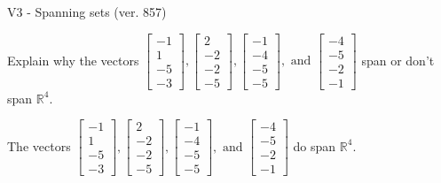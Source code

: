 \begin{exercise}
  \begin{exerciseTitle}V3 - Spanning sets (ver. 857)\end{exerciseTitle}
  \begin{exerciseStatement}
    Explain why the vectors \(\left[\begin{array}{r}
-1 \\
1 \\
-5 \\
-3
\end{array}\right] , \left[\begin{array}{r}
2 \\
-2 \\
-2 \\
-5
\end{array}\right] , \left[\begin{array}{r}
-1 \\
-4 \\
-5 \\
-5
\end{array}\right] , \text{ and } \left[\begin{array}{r}
-4 \\
-5 \\
-2 \\
-1
\end{array}\right]\) span or don't span \(\mathbb{R}^4\). 
	


  \end{exerciseStatement}
  \begin{exerciseAnswer}
   The vectors \(\left[\begin{array}{r}
-1 \\
1 \\
-5 \\
-3
\end{array}\right] , \left[\begin{array}{r}
2 \\
-2 \\
-2 \\
-5
\end{array}\right] , \left[\begin{array}{r}
-1 \\
-4 \\
-5 \\
-5
\end{array}\right] , \text{ and } \left[\begin{array}{r}
-4 \\
-5 \\
-2 \\
-1
\end{array}\right]\) 
  	 do  
	span \(\mathbb{R}^4\).
  


  \end{exerciseAnswer}
\end{exercise}